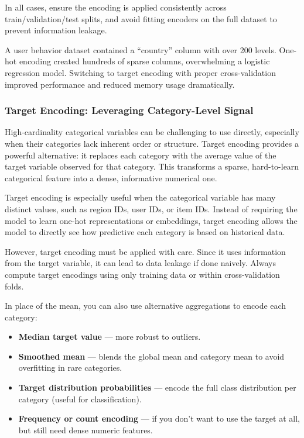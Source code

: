 \documentclass[12pt,openany]{book}
\begin{document}
In all cases, ensure the encoding is applied consistently across train/validation/test splits, and avoid fitting encoders on the full dataset to prevent information leakage. \newline

\begin{examplebox}
A user behavior dataset contained a “country” column with over 200 levels. One-hot encoding created hundreds of sparse columns, overwhelming a logistic regression model. Switching to target encoding with proper cross-validation improved performance and reduced memory usage dramatically.
\end{examplebox}



\subsubsection{Target Encoding: Leveraging Category-Level Signal}

High-cardinality categorical variables can be challenging to use directly, especially when their categories lack inherent order or structure. Target encoding provides a powerful alternative: it replaces each category with the average value of the target variable observed for that category. This transforms a sparse, hard-to-learn categorical feature into a dense, informative numerical one.
\newline

Target encoding is especially useful when the categorical variable has many distinct values, such as region IDs, user IDs, or item IDs. Instead of requiring the model to learn one-hot representations or embeddings, target encoding allows the model to directly see how predictive each category is based on historical data.
\newline

However, target encoding must be applied with care. Since it uses information from the target variable, it can lead to data leakage if done naively. Always compute target encodings using only training data or within cross-validation folds.
\newline

In place of the mean, you can also use alternative aggregations to encode each category:
\begin{itemize}
  \item \textbf{Median target value} — more robust to outliers.
  \item \textbf{Smoothed mean} — blends the global mean and category mean to avoid overfitting in rare categories.
  \item \textbf{Target distribution probabilities} — encode the full class distribution per category (useful for classification).
  \item \textbf{Frequency or count encoding} — if you don’t want to use the target at all, but still need dense numeric features.
\end{itemize}
\end{document}
